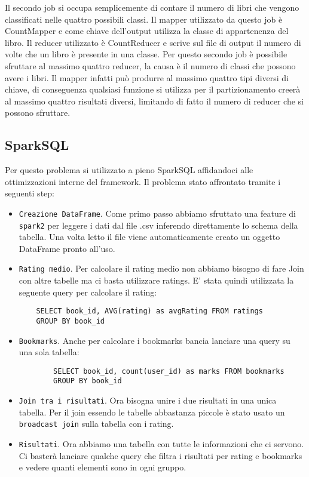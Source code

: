 Il secondo job si occupa semplicemente di contare il numero di libri che vengono classificati nelle quattro possibili classi.
Il mapper utilizzato da questo job è CountMapper e come chiave dell'output utilizza la classe di appartenenza del libro.
Il reducer utilizzato è CountReducer e scrive sul file di output il numero di volte che un libro è presente in una classe.
Per questo secondo job è possibile sfruttare al massimo quattro reducer, la causa è il numero di classi che possono avere i libri.
Il mapper infatti può produrre al massimo quattro tipi diversi di chiave, di conseguenza qualsiasi funzione si utilizza per il partizionamento
creerà al massimo quattro risultati diversi, limitando di fatto il numero di reducer che si possono sfruttare.


\subsection{SparkSQL}
Per questo problema si \è utilizzato a pieno SparkSQL affidandoci alle ottimizzazioni interne del framework. Il problema
\è stato affrontato tramite i seguenti step:
\begin{itemize}
    \item \texttt{Creazione DataFrame}. Come primo passo abbiamo sfruttato una feature di \texttt{spark2} per leggere
    i dati dal file .csv inferendo direttamente lo schema della tabella. Una volta letto il file viene automaticamente creato
    un oggetto DataFrame pronto all'uso.
    \item \texttt{Rating medio}. Per calcolare il rating medio non abbiamo bisogno di fare Join con altre tabelle ma ci basta utilizzare
    ratings. E' stata quindi utilizzata la seguente query per calcolare il rating:
    \begin{verbatim}
    SELECT book_id, AVG(rating) as avgRating FROM ratings
    GROUP BY book_id
    \end{verbatim}
    \item \texttt{Bookmarks}. Anche per calcolare i bookmarks bancia lanciare una query su una sola tabella:
    \begin{verbatim}
        SELECT book_id, count(user_id) as marks FROM bookmarks
        GROUP BY book_id
    \end{verbatim}
    \item \texttt{Join tra i risultati}. Ora bisogna unire i due risultati in una unica tabella. Per il join essendo le
    tabelle abbastanza piccole è stato usato un \texttt{broadcast join} sulla tabella con i rating.
    \item \texttt{Risultati}. Ora abbiamo una tabella con tutte le informazioni che ci servono.
    Ci basterà lanciare qualche query che filtra i risultati per rating e bookmarks e vedere quanti elementi sono in
    ogni gruppo.
\end{itemize}
